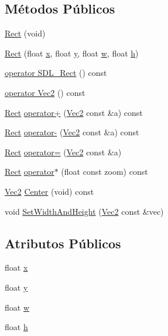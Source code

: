 \subsection*{Métodos Públicos}
\begin{DoxyCompactItemize}
\item 
\hyperlink{classRect_a62fb6094640e8a5a9969382d404e9d5e}{Rect} (void)
\item 
\hyperlink{classRect_a21e3f21b1579b6aea19ea88d89c019ef}{Rect} (float \hyperlink{classRect_a29bc9b88a8c5537620f05ac7069f48cc}{x}, float \hyperlink{classRect_a4ea33d8210fa0b8b0d6ef3f7e06e6b27}{y}, float \hyperlink{classRect_a049f7ee5e7eb0475229bf3ed9b3bad44}{w}, float \hyperlink{classRect_aa10c9b8950c6b23a0b2bf0d39f2be904}{h})
\item 
\hyperlink{classRect_a9a0dccb457b32573b281e1ce7a076c8d}{operator S\+D\+L\+\_\+\+Rect} () const 
\item 
\hyperlink{classRect_a8649d07c49ee8f230b362a223fa0f5e9}{operator Vec2} () const 
\item 
\hyperlink{classRect}{Rect} \hyperlink{classRect_af3213bdcfa1920ab6b5fed108ac5c374}{operator+} (\hyperlink{classVec2}{Vec2} const \&a) const 
\item 
\hyperlink{classRect}{Rect} \hyperlink{classRect_af033df220edef5de3488e18c163b2b39}{operator-\/} (\hyperlink{classVec2}{Vec2} const \&a) const 
\item 
\hyperlink{classRect}{Rect} \hyperlink{classRect_aca144c3e9d36600106932e22a5659513}{operator=} (\hyperlink{classVec2}{Vec2} const \&a)
\item 
\hyperlink{classRect}{Rect} \hyperlink{classRect_a42a400642b9e5d2895a6c432ff11a168}{operator$\ast$} (float const zoom) const 
\item 
\hyperlink{classVec2}{Vec2} \hyperlink{classRect_ac42ead7988bf077364ce61231980bff2}{Center} (void) const 
\item 
void \hyperlink{classRect_a5751026840c842f72e1f79cb82d9554c}{Set\+Width\+And\+Height} (\hyperlink{classVec2}{Vec2} const \&vec)
\end{DoxyCompactItemize}
\subsection*{Atributos Públicos}
\begin{DoxyCompactItemize}
\item 
float \hyperlink{classRect_a29bc9b88a8c5537620f05ac7069f48cc}{x}
\item 
float \hyperlink{classRect_a4ea33d8210fa0b8b0d6ef3f7e06e6b27}{y}
\item 
float \hyperlink{classRect_a049f7ee5e7eb0475229bf3ed9b3bad44}{w}
\item 
float \hyperlink{classRect_aa10c9b8950c6b23a0b2bf0d39f2be904}{h}
\end{DoxyCompactItemize}



